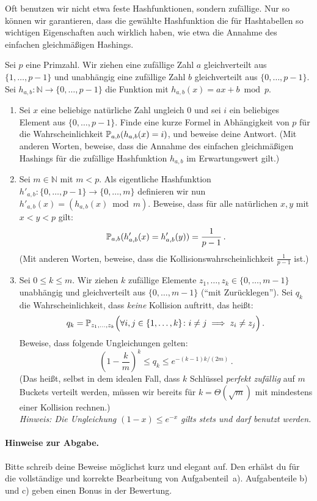 \documentclass{uebung_cs}
\begin{document}
Oft benutzen wir nicht etwa feste Hashfunktionen, sondern zufällige.
Nur so können wir garantieren, dass die gewählte Hashfunktion die für Hashtabellen so wichtigen Eigenschaften auch wirklich haben, wie etwa die Annahme des einfachen gleichmäßigen Hashings.

Sei $p$ eine Primzahl.
Wir ziehen eine zufällige Zahl $a$ gleichverteilt aus $\{1,\dots,p-1\}$ und unabhängig eine zufällige Zahl $b$ gleichverteilt aus $\{0,\dots,p-1\}$.
Sei $h_{a,b}\colon\mathbb N\to\{0,\dots,p-1\}$ die Funktion mit $h_{a,b}(x)=ax+b\bmod p$.

\begin{enumerate}
    \item Sei $x$ eine beliebige natürliche Zahl ungleich $0$ und sei $i$ ein beliebiges Element aus $\{0,\dots,p-1\}$.
    Finde eine kurze Formel in Abhängigkeit von $p$ für die Wahrscheinlichkeit $\mathbb P_{a,b}(h_{a,b}(x)=i)$, und beweise deine Antwort. (Mit anderen Worten, beweise, dass die Annahme des einfachen gleichmäßigen Hashings für die zufällige Hashfunktion $h_{a,b}$ im Erwartungswert gilt.)
    \item Sei $m\in\mathbb N$ mit $m<p$.
    Als eigentliche Hashfunktion $h'_{a,b}\colon\{0,\dots,p-1\}\to\{0,\dots,m\}$ definieren wir nun $h'_{a,b}(x)=(h_{a,b}(x) \bmod m)$.
    Beweise, dass für alle natürlichen $x,y$ mit $x<y<p$ gilt:
    \[\mathbb P_{a,b}(h'_{a,b}(x)=h'_{a,b}(y))=\frac{1}{p-1}\,.\]
    (Mit anderen Worten, beweise, dass die Kollisionswahrscheinlichkeit $\frac{1}{p-1}$ ist.)
    \item Sei $0\le k\le m$. Wir ziehen $k$ zufällige Elemente $z_1,\dots,z_k\in \{0,\dots,m-1\}$ unabhängig und gleichverteilt aus $\{0,\dots,m-1\}$ (``mit Zurücklegen''). Sei $q_k$ die Wahrscheinlichkeit, dass \emph{keine} Kollision auftritt, das heißt:
    \[q_k=\mathbb P_{z_1,\dots,z_k}\Big(\forall i,j\in \{1,\dots,k\}\colon i\ne j \implies z_i\ne z_j\Big)\,.\]
    Beweise, dass folgende Ungleichungen gelten:
    \[
        \left(1-\frac{k}{m}\right)^k\le q_k \leq e^{-(k-1)k/(2m)}\,.
    \]
    (Das heißt, selbst in dem idealen Fall, dass $k$ Schlüssel \emph{perfekt zufällig} auf $m$ Buckets verteilt werden, müssen wir bereits für $k=\Theta(\sqrt{m})$ mit mindestens einer Kollision rechnen.)\\
    \emph{Hinweis: Die Ungleichung $(1-x)\le e^{-x}$ gilts stets und darf benutzt werden.}
\end{enumerate}

\paragraph*{Hinweise zur Abgabe.}
Bitte schreib deine Beweise möglichst kurz und elegant auf.
Den  erhälst du für die vollständige und korrekte Bearbeitung von Aufgabenteil~a). Aufgabenteile b) und c) geben einen Bonus in der Bewertung.
\end{document}
